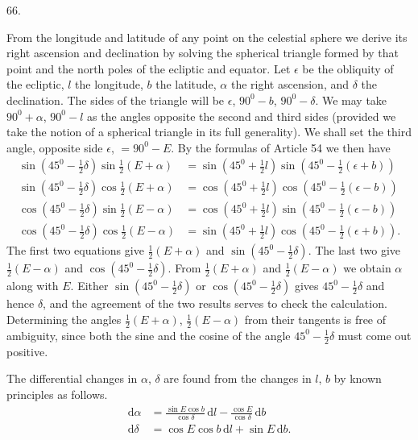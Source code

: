 \par{}\medskip
\hypertarget{native-085-article066}{}
\begin{center}66.\end{center}
From the longitude and latitude of any point on the celestial sphere we derive its right ascension and declination by solving the spherical triangle formed by that point and the north poles of the ecliptic and equator. Let $\epsilon$ be the obliquity of the ecliptic, $l$ the longitude, $b$ the latitude, $\alpha$ the right ascension, and $\delta$ the declination. The sides of the triangle will be $\epsilon$, $90^0-b$, $90^0-\delta$. We may take $90^0+\alpha$, $90^0-l$ as the angles opposite the second and third sides (provided we take the notion of a spherical triangle in its full generality). We shall set the third angle, opposite side $\epsilon$, $=90^0-E$. By the formulas of Article 54 we then have
\[
\begin{aligned}
\sin(45^0-\tfrac12\delta)\sin\tfrac12(E+\alpha)&=\sin(45^0+\tfrac12 l)\sin(45^0-\tfrac12(\epsilon+b))\\[.5em]
\sin(45^0-\tfrac12\delta)\cos\tfrac12(E+\alpha)&=\cos(45^0+\tfrac12 l)\cos(45^0-\tfrac12(\epsilon-b))\\[.5em]
\cos(45^0-\tfrac12\delta)\sin\tfrac12(E-\alpha)&=\cos(45^0+\tfrac12 l)\sin(45^0-\tfrac12(\epsilon-b))\\[.5em]
\cos(45^0-\tfrac12\delta)\cos\tfrac12(E-\alpha)&=\sin(45^0+\tfrac12 l)\cos(45^0-\tfrac12(\epsilon+b)).
\end{aligned}
\]
\noindent The first two equations give $\tfrac12(E+\alpha)$ and $\sin(45^0-\tfrac12\delta)$. The last two give $\tfrac12(E-\alpha)$ and $\cos(45^0-\tfrac12\delta)$. From $\tfrac12(E+\alpha)$ and $\tfrac12(E-\alpha)$ we obtain $\alpha$ along with $E$. Either $\sin(45^0-\tfrac12\delta)$ or $\cos(45^0-\tfrac12\delta)$ gives $45^0-\tfrac12\delta$ and hence $\delta$, and the agreement of the two results serves to check the calculation. Determining the angles $\tfrac12(E+\alpha)$, $\tfrac12(E-\alpha)$ from their tangents is free of ambiguity, since both the sine and the cosine of the angle $45^0-\tfrac12\delta$ must come out positive.

The differential changes in $\alpha$, $\delta$ are found from the changes in $l$, $b$ by known principles as follows.
\[
\begin{aligned}
\mathrm{d}\alpha&=\frac{\sin E\cos b}{\cos\delta}\,\mathrm{d}l-\frac{\cos E}{\cos\delta}\,\mathrm{d}b\\[.6em]
\mathrm{d}\delta&=\cos E\cos b\,\mathrm{d}l+\sin E\,\mathrm{d}b.
\end{aligned}
\]
